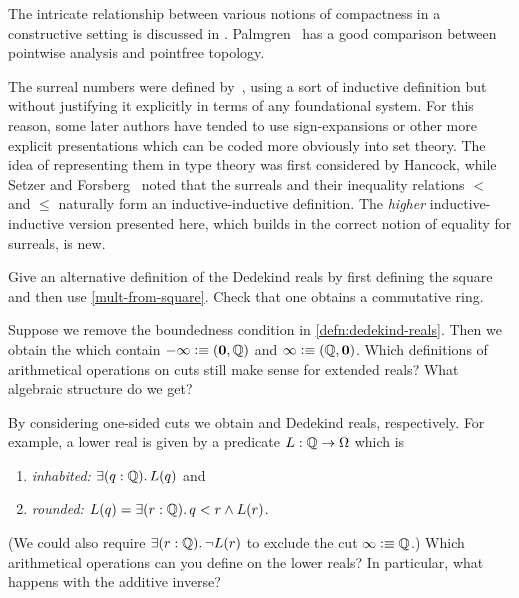 The intricate relationship between various notions of compactness in a constructive
setting is discussed in \cite{bridges2002compactness}. Palmgren~\cite{Palmgren:FT} has a 
good comparison between pointwise analysis and 
pointfree topology.

The surreal numbers were defined by~\cite{conway:onag}, using a sort of inductive definition but without justifying it explicitly in terms of any foundational system.
For this reason, some later authors have tended to use sign-expansions or other more explicit presentations which can be coded more obviously into set theory.
The idea of representing them in type theory was first considered by Hancock, while
Setzer and Forsberg~\cite{forsbergfinite} noted that the surreals and their inequality relations $<$ and $\le$ naturally form an inductive-inductive definition.
The \emph{higher} inductive-inductive version presented here, which builds in the correct notion of equality for surreals, is new.


\sectionExercises

\begin{ex}
 Give an alternative definition of the Dedekind reals by first defining the square and then use \autoref{mult-from-square}.
 Check that one obtains a commutative ring.
\end{ex}

\begin{ex} \label{ex:RD-extended-reals}
  Suppose we remove the boundedness condition in \autoref{defn:dedekind-reals}.
  Then we obtain the 
  which contain $-\infty \vcentcolon\equiv
  (\mathbf{0}, \mathbb{Q})$ and $\infty \vcentcolon\equiv (\mathbb{Q}, \mathbf{0})$. Which definitions of arithmetical
  operations on cuts still make sense for extended reals? What algebraic structure do we
  get?
\end{ex}

\begin{ex} \label{ex:RD-lower-cuts}
  By considering one-sided cuts we obtain  and  Dedekind reals,
  respectively. For example, a lower real is given by a predicate $L : \mathbb{Q} \to \Omega$
  which is
  \begin{enumerate}
  \item \emph{inhabited:} $\exis{q : \Q} L(q)$ and
  \item \emph{rounded:} $L(q) = \exis{r : \Q} q < r \land L(r)$.
  \end{enumerate}
  (We could also require $\exis{r : \Q} \lnot L(r)$ to exclude the cut $\infty \vcentcolon\equiv
  \mathbb{Q}$.) Which arithmetical operations can you define on the lower reals? In particular,
  what happens with the additive inverse?
\end{ex}

